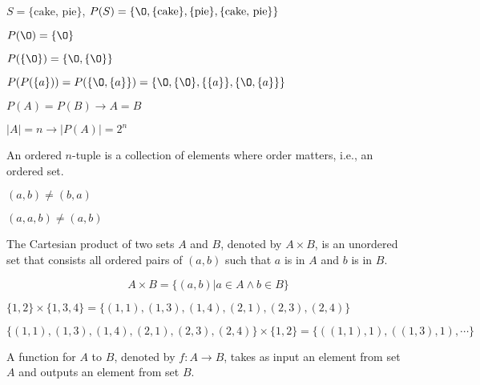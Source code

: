 \begin{ex}
$S = \{\text{cake, pie}\}$, $P(S) = \{ \O, \{\text{cake}\}, \{\text{pie}\}, \{\text{cake, pie}\} \}$
\end{ex}

\begin{ex}
$P(\O) = \{ \O \}$
\end{ex}

\begin{ex}
$P(\{ \O \}) = \{ \O, \{ \O \} \}$
\end{ex}

\begin{ex}
$P(P(\{a\})) = P(\{ \O, \{ a \} \}) = \{ \O, \{ \O \}, \{ \{ a \} \}, \{ \O, \{ a \} \} \}$
\end{ex}

$P(A) = P(B) \rightarrow A = B$

$|A| = n \rightarrow |P(A)| = 2^n$


\begin{defn}
An ordered $n$-tuple is a collection of elements where order matters, i.e., an ordered set.
\end{defn}

\begin{ex}
$(a, b) \neq (b, a)$
\end{ex}

\begin{ex}
$(a, a, b) \neq (a, b)$
\end{ex}

\begin{defn}
The Cartesian product of two sets $A$ and $B$, denoted by $A \times B$, is an unordered set that consists all ordered pairs of $(a, b)$ such that $a$ is in $A$ and $b$ is in $B$.

$$A \times B = \{ (a, b) | a \in A \land b \in B\}$$
\end{defn}

\begin{ex}
$\{1, 2\} \times \{1, 3, 4\} = \{(1, 1), (1, 3), (1, 4), (2, 1), (2, 3), (2, 4) \}$
\end{ex}

\begin{ex}
$\{(1, 1), (1, 3), (1, 4), (2, 1), (2, 3), (2, 4) \} \times \{1, 2\} = \{((1, 1), 1), ((1, 3), 1), \cdots\}$
\end{ex}

\begin{defn}
A function for $A$ to $B$, denoted by $f: A \rightarrow B$, takes as input an element from set $A$ and outputs an element from set $B$.
\end{defn}

